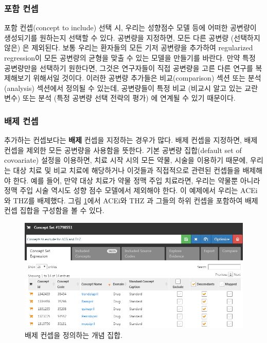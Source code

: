 \documentclass[11pt]{book}
\theoremstyle{definition}
\theoremstyle{definition}
\theoremstyle{definition}
\theoremstyle{remark}
\begin{document}
\subsubsection*{포함 컨셉}\label{-}

포함 컨셉(concept to include) 선택 시, 우리는 성향점수 모델 등에 어떠한
공변량이 생성되기를 원하는지 선택할 수 있다. 공변량을 지정하면, 모든
다른 공변량 (선택하지 않은) 은 제외된다. 보통 우리는 환자들의 모든 기저
공변량을 추가하여 regularized regression이 모든 공변량의 균형을 맞출 수
있는 모델을 만들기를 바란다. 만약 특정 공변량만을 선택하기 원한다면,
그것은 연구자들이 직접 공변량을 고른 다른 연구를 복제해보기 위해서일
것이다. 이러한 공변량 추가들은 비교(comparison) 섹션 또는 분석(analysis)
섹션에서 정의될 수 있는데, 공변량들이 특정 비교 (비교시 알고 있는
교란변수) 또는 분석 (특정 공변량 선택 전략의 평가) 에 연계될 수 있기
때문이다.

\subsubsection*{배제 컨셉}\label{-}

추가하는 컨셉보다는 \textbf{배제} 컨셉을 지정하는 경우가 많다. 배제
컨셉을 지정하면, 배제 컨셉을 제외한 모든 공변량을 사용함을 뜻한다. 기본
공변량 집합(default set of covoariate) 설정을 이용하면, 치료 시작 시의
모든 약물, 시술을 이용하기 때문에, 우리는 대상 치료 및 비교 치료에
해당하거나 이것들과 직접적으로 관련된 컨셉들을 배제해야 한다. 예를 들어,
만약 대상 치료가 약물 정맥 주입 치료라면, 우리는 약물뿐 아니라 정맥 주입
시술 역시도 성향 점수 모델에서 제외해야 한다. 이 예제에서 우리는 ACEi와
THZ를 배제했다. 그림 \ref{fig:covsToExclude}에서 ACEi와 THZ 과 그들의
하위 컨셉을 포함하여 배제 컨셉 집합을 구성함을 볼 수 있다.

\begin{figure}

{\centering \includegraphics[width=1\linewidth]{images/PopulationLevelEstimation/covsToExclude} 

}

\caption{배제 컨셉을 정의하는 개념 집합.}\label{fig:covsToExclude}
\end{figure}
\end{document}
